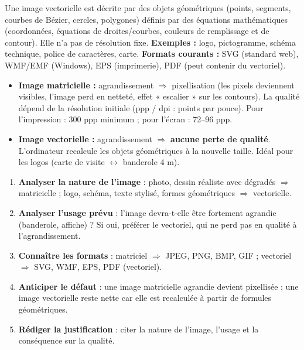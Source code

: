 \documentclass[11pt]{article}
\newcommand{\cle}[1]{{\popxbold\color{popdark}#1}}
\begin{document}
\begin{definition}
Une \cle{image vectorielle} est décrite par des \cle{objets géométriques} (points, segments, courbes de Bézier, cercles, polygones) définis par des équations mathématiques (coordonnées, équations de droites/courbes, couleurs de remplissage et de contour). Elle n'a pas de résolution fixe. \textbf{Exemples :} logo, pictogramme, schéma technique, police de caractères, carte. \textbf{Formats courants :} SVG (standard web), WMF/EMF (Windows), EPS (imprimerie), PDF (peut contenir du vectoriel).
\end{definition}

\begin{propriete}
\begin{itemize}
\item \textbf{Image matricielle :} agrandissement $\Rightarrow$ \cle{pixellisation} (les pixels deviennent visibles, l'image perd en netteté, effet « escalier » sur les contours). La qualité dépend de la \cle{résolution} initiale (ppp / dpi : points par pouce). Pour l'impression : 300 ppp minimum ; pour l'écran : 72--96 ppp.
\item \textbf{Image vectorielle :} agrandissement $\Rightarrow$ \textbf{aucune perte de qualité}. L'ordinateur recalcule les objets géométriques à la nouvelle taille. Idéal pour les logos (carte de visite $\leftrightarrow$ banderole 4 m).
\end{itemize}
\end{propriete}

\begin{methode}
\begin{enumerate}
\item \textbf{Analyser la nature de l'image} : photo, dessin réaliste avec dégradés $\Rightarrow$ matricielle ; logo, schéma, texte stylisé, formes géométriques $\Rightarrow$ vectorielle.
\item \textbf{Analyser l'usage prévu} : l'image devra-t-elle être fortement agrandie (banderole, affiche) ? Si oui, préférer le \cle{vectoriel}, qui ne perd pas en qualité à l'agrandissement.
\item \textbf{Connaître les formats} : matriciel $\Rightarrow$ JPEG, PNG, BMP, GIF ; vectoriel $\Rightarrow$ SVG, WMF, EPS, PDF (vectoriel).
\item \textbf{Anticiper le défaut} : une image matricielle agrandie devient \cle{pixellisée} ; une image vectorielle reste nette car elle est recalculée à partir de formules géométriques.
\item \textbf{Rédiger la justification} : citer la nature de l'image, l'usage et la conséquence sur la qualité.
\end{enumerate}
\end{methode}
\end{document}
